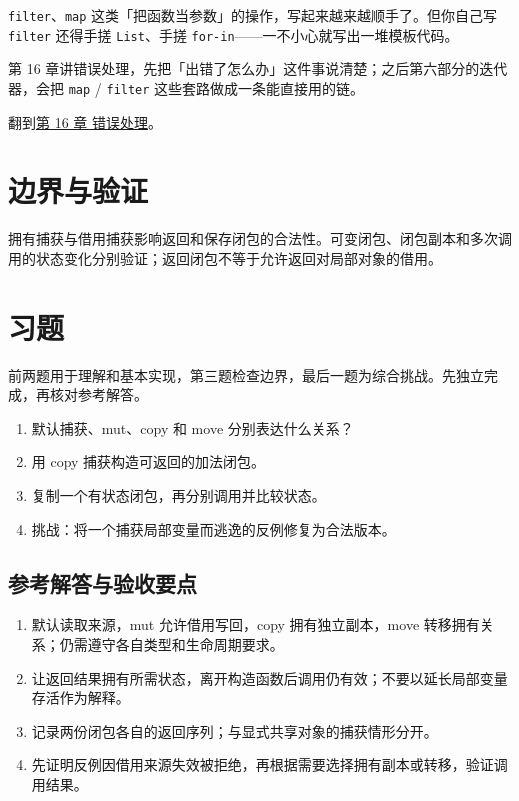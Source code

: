 \texttt{filter}、\texttt{map} 这类「把函数当参数」的操作，写起来越来越顺手了。但你自己写 \texttt{filter} 还得手搓 \texttt{List}、手搓 \texttt{for-in}——一不小心就写出一堆模板代码。

第 16 章讲错误处理，先把「出错了怎么办」这件事说清楚；之后第六部分的迭代器，会把 \texttt{map} / \texttt{filter} 这些套路做成一条能直接用的链。

翻到\hyperref[ch:16]{第 16 章 错误处理}。

\section{边界与验证}

拥有捕获与借用捕获影响返回和保存闭包的合法性。可变闭包、闭包副本和多次调用的状态变化分别验证；返回闭包不等于允许返回对局部对象的借用。

\section{习题}

前两题用于理解和基本实现，第三题检查边界，最后一题为综合挑战。先独立完成，再核对参考解答。

\begin{enumerate}

\item 默认捕获、mut、copy 和 move 分别表达什么关系？

\item 用 copy 捕获构造可返回的加法闭包。

\item 复制一个有状态闭包，再分别调用并比较状态。

\item 挑战：将一个捕获局部变量而逃逸的反例修复为合法版本。

\end{enumerate}

\subsection*{参考解答与验收要点}

\begin{enumerate}

\item 默认读取来源，mut 允许借用写回，copy 拥有独立副本，move 转移拥有关系；仍需遵守各自类型和生命周期要求。

\item 让返回结果拥有所需状态，离开构造函数后调用仍有效；不要以延长局部变量存活作为解释。

\item 记录两份闭包各自的返回序列；与显式共享对象的捕获情形分开。

\item 先证明反例因借用来源失效被拒绝，再根据需要选择拥有副本或转移，验证调用结果。

\end{enumerate}

